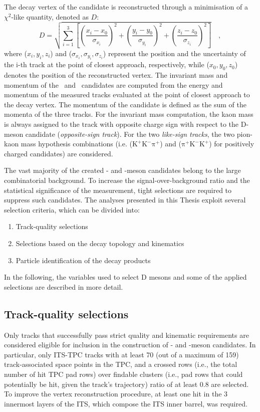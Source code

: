 The decay vertex of the candidate is reconstructed through a minimisation of a $\chi^2$-like quantity, denoted as $D$:
\begin{equation*}
    D = \sqrt{\sum_{i=1}^3 \left[\left(\frac{x_i-x_0}{\sigma_{x_i}}\right)^2 + \left(\frac{y_i-y_0}{\sigma_{y_i}}\right)^2 +\left(\frac{z_i-z_0}{\sigma_{z_i}}\right)^2\right]}\quad ,
\end{equation*}
where ($x_i,y_i,z_i$) and ($\sigma_{x_i},\sigma_{y_i},\sigma_{z_i}$) represent the position and the uncertainty of the i-th track at the point of closest approach, respectively, while ($x_0,y_0,z_0$) denotes the position of the reconstructed vertex. The invariant mass and momentum of the \ds\ and \dpl\ candidates are computed from the energy and momentum of the measured tracks evaluated at the point of closest approach to the decay vertex. The momentum of the candidate is defined as the sum of the momenta of the three tracks. For the invariant mass computation, the kaon mass is always assigned to the track with opposite charge sign with respect to the D-meson candidate (\emph{opposite-sign track}). For the two \emph{like-sign tracks}, the two pion-kaon mass hypothesis combinations \big(i.e. ($\mathrm{K^+K^-\pi^+}$) and ($\mathrm{\pi^+K^-K^+}$) for positively charged candidates\big) are considered. 

The vast majority of the created \ds- and \dpl-meson candidates belong to the large combinatorial background. To increase the signal-over-background ratio and the statistical significance of the measurement, tight selections are required to suppress such candidates. The analyses presented in this Thesis exploit several selection criteria, which can be divided into:
\begin{enumerate}[i]
    \item Track-quality selections
    \item Selections based on the decay topology and kinematics
    \item Particle identification of the decay products
\end{enumerate}
In the following, the variables used to select D mesons and some of the applied selections are described in more detail.

\subsection{Track-quality selections}
Only tracks that successfully pass strict quality and kinematic requirements are considered eligible for inclusion in the construction of \ds- and \dpl-meson candidates. In particular, only ITS-TPC tracks with at least 70 (out of a maximum of 159) track-associated space points in the TPC, and a crossed rows (i.e., the total number of hit TPC pad rows) over findable clusters (i.e., pad rows that could potentially be hit, given the track's trajectory) ratio of at least 0.8 are selected. To improve the vertex reconstruction procedure, at least one hit in the 3 innermost layers of the ITS, which compose the ITS inner barrel, was required.

